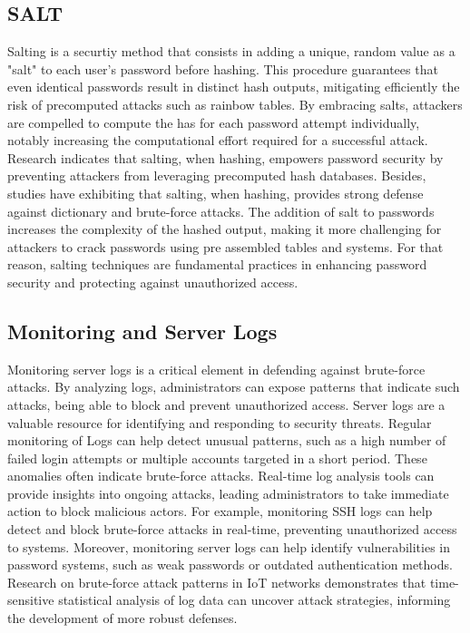 \documentclass{comjnl}
\begin{document}
\subsection{SALT}
Salting is a securtiy method that consists in adding a unique, random value as a "salt" to each user's password before hashing. This procedure guarantees that even identical passwords result in distinct hash outputs, mitigating efficiently the risk of precomputed attacks such as rainbow tables. By embracing salts, attackers are compelled to compute the has for each password attempt individually, notably increasing the computational effort required for a successful attack. Research indicates that salting, when hashing, empowers password security by preventing attackers from leveraging precomputed hash databases. \cite{salting_description} Besides, studies have exhibiting that salting, when hashing, provides strong defense against dictionary and brute-force attacks. The addition of salt to passwords increases the complexity of the hashed output, making it more challenging for attackers to crack passwords using pre assembled tables and systems. \cite{salting_algo} For that reason, salting techniques are fundamental practices in enhancing password security and protecting against unauthorized access.

\subsection{Monitoring and Server Logs}
Monitoring server logs is a critical element in defending against brute-force attacks. By analyzing logs, administrators can expose patterns that indicate such attacks, being able to block and prevent unauthorized access. Server logs are a valuable resource for identifying and responding to security threats.  Regular monitoring of Logs can help detect unusual patterns, such as a high number of failed login attempts or multiple accounts targeted in a short period. These anomalies often indicate brute-force attacks.  Real-time log analysis tools can provide insights into ongoing attacks, leading administrators to take immediate action to block malicious actors. For example, monitoring SSH logs can help detect and block brute-force attacks in real-time, preventing unauthorized access to systems. \cite{risk_monitoring} Moreover, monitoring server logs can help identify vulnerabilities in password systems, such as weak passwords or outdated authentication methods. Research on brute-force attack patterns in IoT networks demonstrates that time-sensitive statistical analysis of log data can uncover attack strategies, informing the development of more robust defenses.\cite{brute_force_patterns}
\end{document}
